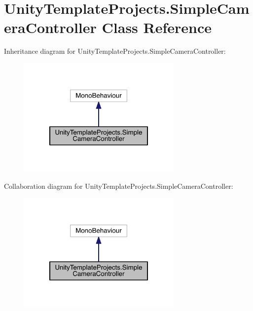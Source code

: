 \hypertarget{class_unity_template_projects_1_1_simple_camera_controller}{}\section{Unity\+Template\+Projects.\+Simple\+Camera\+Controller Class Reference}
\label{class_unity_template_projects_1_1_simple_camera_controller}


Inheritance diagram for Unity\+Template\+Projects.\+Simple\+Camera\+Controller\+:\nopagebreak
\begin{figure}[H]
\begin{center}
\leavevmode
\includegraphics[width=228pt]{class_unity_template_projects_1_1_simple_camera_controller__inherit__graph}
\end{center}
\end{figure}


Collaboration diagram for Unity\+Template\+Projects.\+Simple\+Camera\+Controller\+:\nopagebreak
\begin{figure}[H]
\begin{center}
\leavevmode
\includegraphics[width=228pt]{class_unity_template_projects_1_1_simple_camera_controller__coll__graph}
\end{center}
\end{figure}
